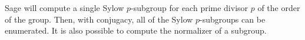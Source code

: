 Sage will compute a single Sylow $p$-subgroup for each prime divisor $p$ of the order of the group.  Then, with conjugacy, all of the Sylow $p$-subgroups can be enumerated.  It is also possible to compute the normalizer of a subgroup.
